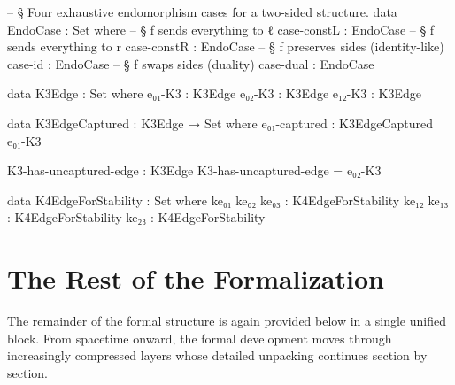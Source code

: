 \documentclass[11pt,a4paper]{book}
\begin{document}
\begin{code}

-- § Four exhaustive endomorphism cases for a two-sided structure.
data EndoCase : Set where
  -- § f sends everything to ℓ
  case-constL : EndoCase
  -- § f sends everything to r
  case-constR : EndoCase
  -- § f preserves sides (identity-like)
  case-id     : EndoCase
  -- § f swaps sides (duality)
  case-dual   : EndoCase

data K3Edge : Set where
  e₀₁-K3 : K3Edge
  e₀₂-K3 : K3Edge
  e₁₂-K3 : K3Edge

data K3EdgeCaptured : K3Edge → Set where
  e₀₁-captured : K3EdgeCaptured e₀₁-K3

K3-has-uncaptured-edge : K3Edge
K3-has-uncaptured-edge = e₀₂-K3

data K4EdgeForStability : Set where
  ke₀₁ ke₀₂ ke₀₃ : K4EdgeForStability
  ke₁₂ ke₁₃ : K4EdgeForStability
  ke₂₃ : K4EdgeForStability

\end{code}
\chapter{The Rest of the Formalization}
The remainder of the formal structure is again provided below in a single unified block. From spacetime onward, the formal development moves through increasingly compressed layers whose detailed unpacking continues section by section.
\end{document}
